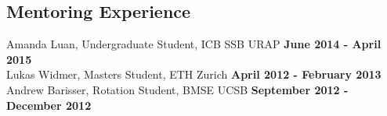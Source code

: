 {%

\subsection*{Mentoring Experience}
Amanda Luan, Undergraduate Student, ICB SSB URAP \hfill {\bf June 2014 - April 2015} \\
Lukas Widmer, Masters Student, ETH Zurich \hfill {\bf April 2012 - February 2013} \\
Andrew Barisser, Rotation Student, BMSE UCSB \hfill {\bf September 2012 - December 2012}

}
